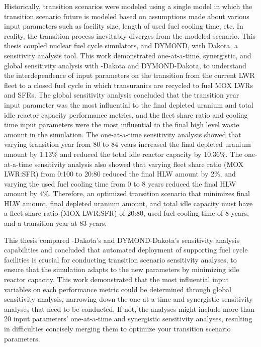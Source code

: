 Historically, transition scenarios were modeled 
using a single model in which the transition scenario future 
is modeled based on assumptions made about various input parameters 
such as facility size, length of used fuel cooling time, etc. 
In reality, the transition process inevitably diverges from the 
modeled scenario. 
This thesis coupled nuclear fuel cycle simulators, \Cyclus and 
DYMOND, with Dakota, a sensitivity analysis tool.
This work demonstrated one-at-a-time, synergistic, and 
global sensitivity analysis with \Cyclus-Dakota and DYMOND-Dakota,
to understand the interdependence of input parameters on the  
transition from the current 
LWR fleet to a closed fuel cycle in which transuranics are recycled to fuel 
MOX LWRs and SFRs. 
The global sensitivity analysis concluded that 
the transition year input parameter was the most influential
to the final depleted uranium and total idle reactor capacity 
performance metrics, and  
the fleet share ratio and cooling time input parameters 
were the most influential to the final high level waste amount in the 
simulation. 
The one-at-a-time sensitivity analysis showed that varying transition 
year from 80 to 84 years increased the final depleted uranium amount by 
1.13\% and reduced the total idle reactor capacity by 10.36\%. 
The one-at-a-time sensitivity analysis also showed that varying 
fleet share ratio (MOX LWR:SFR) from 0:100 to 20:80 reduced the 
final HLW amount by 2\%, and varying the used fuel cooling time from 0 to 
8 years reduced the final HLW amount by 4\%. 
Therefore, an optimized transition scenario that minimizes final 
HLW amount, final depleted uranium amount, and total idle capacity 
must have a fleet share ratio (MOX LWR:SFR) of 20:80, used fuel cooling time 
of 8 years, and a transition year at 83 years. 

This thesis compared \Cyclus-Dakota's and DYMOND-Dakota's sensitivity analysis 
capabilities 
and concluded that automated deployment of supporting fuel cycle 
facilities is crucial for conducting transition scenario sensitivity analyses, 
to ensure that the simulation 
adapts to the new parameters by minimizing idle reactor capacity.
This work demonstrated that the most influential input variables 
on each performance 
metric could be determined through global sensitivity 
analysis, narrowing-down the one-at-a-time and 
synergistic sensitivity analyses that need to be conducted.  
If not, the analyses might include more than 20 input parameters' 
one-at-a-time and synergistic sensitivity analyses, 
resulting in difficulties concisely merging them to optimize your 
transition scenario parameters.

